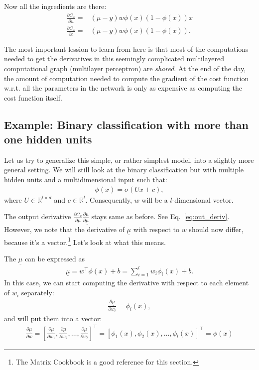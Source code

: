 \documentclass{report}
\newcommand{\RR}[0]{\mathbb{R}}
\begin{document}
Now all the ingredients are there:
\begin{align*}
    \frac{\partial C_x}{\partial u} =& (\mu -y) w \phi(x) (1-\phi(x)) x \\
    \frac{\partial C_x}{\partial c} =& (\mu -y) w \phi(x) (1-\phi(x)).
\end{align*}

The most important lession to learn from here is that most of the computations
needed to get the derivatives in this seemingly complicated multilayered
computational graph (multilayer perceptron) are {\em shared}. At the end of the
day, the amount of computation needed to compute the gradient of the cost
function w.r.t. all the parameters in the network is only as expensive as
computing the cost function itself.

\subsection{Example: Binary classification with more than one hidden units}
\label{sec:example2}

Let us try to generalize this simple, or rather simplest model, into a slightly
more general setting. We will still look at the binary classification but with
multiple hidden units and a multidimensional input such that:
\begin{align*}
    \phi(x) = \sigma(U x + c),
\end{align*}
where $U \in \RR^{l \times d}$ and $c \in \RR^l$. Consequently, $w$ will be a
$l$-dimensional vector.

The output derivative $\frac{\partial C_x}{\partial \mu}\frac{\partial
\mu}{\partial \underline{\mu}}$ stays same as before. See
Eq.~\eqref{eq:out_deriv}.
However, we note that the derivative of $\underline{\mu}$ with respect to $w$
should now differ, because it's a vector.\footnote{
    The Matrix Cookbook \citep{petersen2008matrix} is a good reference for this
    section.
}
Let's look at what this means.

The $\underline{\mu}$ can be expressed as
\begin{align}
    \label{eq:mu_vec}
    \underline{\mu} = w^\top \phi(x) + b = \sum_{i=1}^l w_i \phi_i(x) + b.
\end{align}
In this case, we can start computing the derivative with respect to each element
of $w_i$ separately:
\begin{align*}
    \frac{\partial \underline{\mu}}{\partial w_i} = \phi_i(x),
\end{align*}
and will put them into a vector:
\begin{align*}
    \frac{\partial \underline{\mu}}{\partial w} = \left[ 
        \frac{\partial \underline{\mu}}{\partial w_1}, \frac{\partial
        \underline{\mu}}{\partial w_2}, \ldots, \frac{\partial
        \underline{\mu}}{\partial w_l}
    \right]^\top = \left[ \phi_1(x), \phi_2(x), \ldots, \phi_l(x) \right]^\top
    = \phi(x)
\end{align*}
\end{document}
